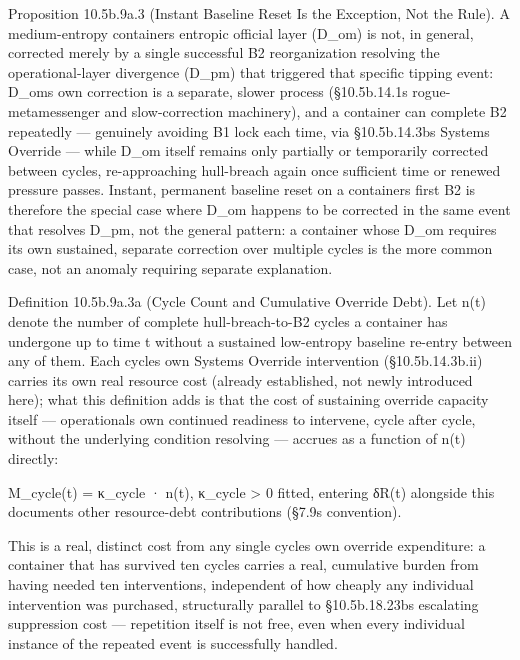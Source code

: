 \documentclass[
]{article}
\begin{document}
Proposition 10.5b.9a.3 (Instant Baseline Reset Is the Exception, Not the
Rule). A medium-entropy containers entropic official layer (D\_om) is
not, in general, corrected merely by a single successful B2
reorganization resolving the operational-layer divergence (D\_pm) that
triggered that specific tipping event: D\_oms own correction is a
separate, slower process (§10.5b.14.1s rogue-metamessenger and
slow-correction machinery), and a container can complete B2 repeatedly
--- genuinely avoiding B1 lock each time, via §10.5b.14.3bs Systems
Override --- while D\_om itself remains only partially or temporarily
corrected between cycles, re-approaching hull-breach again once
sufficient time or renewed pressure passes. Instant, permanent baseline
reset on a containers first B2 is therefore the special case where D\_om
happens to be corrected in the same event that resolves D\_pm, not the
general pattern: a container whose D\_om requires its own sustained,
separate correction over multiple cycles is the more common case, not an
anomaly requiring separate explanation.

Definition 10.5b.9a.3a (Cycle Count and Cumulative Override Debt). Let
n(t) denote the number of complete hull-breach-to-B2 cycles a container
has undergone up to time t without a sustained low-entropy baseline
re-entry between any of them. Each cycles own Systems Override
intervention (§10.5b.14.3b.ii) carries its own real resource cost
(already established, not newly introduced here); what this definition
adds is that the cost of sustaining override capacity itself ---
operationals own continued readiness to intervene, cycle after cycle,
without the underlying condition resolving --- accrues as a function of
n(t) directly:

M\_cycle(t) = κ\_cycle · n(t), κ\_cycle \textgreater{} 0 fitted,
entering δR(t) alongside this documents other resource-debt
contributions (§7.9s convention).

This is a real, distinct cost from any single cycles own override
expenditure: a container that has survived ten cycles carries a real,
cumulative burden from having needed ten interventions, independent of
how cheaply any individual intervention was purchased, structurally
parallel to §10.5b.18.23bs escalating suppression cost --- repetition
itself is not free, even when every individual instance of the repeated
event is successfully handled.
\end{document}
